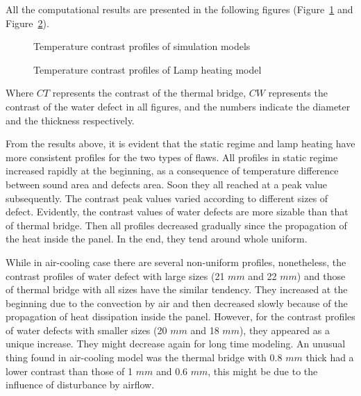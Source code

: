 All the computational results are presented in the following figures (Figure~\ref{sim_fig_stat} and Figure~\ref{sim_fig_ht}).
\begin{figure}[h]
    \hspace{-15pt}
    \caption{Temperature contrast profiles of simulation models}
    \label{sim_fig_stat}
\end{figure}

\begin{figure}[h]
    \hspace{-15pt}
    \caption{Temperature contrast profiles of Lamp heating model}
    \label{sim_fig_ht}
\end{figure}
Where $ CT $ represents the contrast of the thermal bridge, $ CW $ represents the contrast of the water defect in all figures, and the numbers indicate the diameter and the thickness respectively. 

From the results above, it is evident that the static regime and lamp heating have more consistent profiles for the two types of flaws. All profiles in static regime increased rapidly at the beginning, as a consequence of temperature difference between sound area and defects area. Soon they all reached at a peak value subsequently. The contrast peak values varied according to different sizes of defect. Evidently, the contrast values of water defects are more sizable than that of thermal bridge. Then all profiles decreased gradually since the propagation of the heat inside the panel. In the end, they tend around whole uniform. 

While in air-cooling case there are several non-uniform profiles, nonetheless, the contrast profiles of water defect with large sizes (21 $mm $ and 22 $ mm $) and those of thermal bridge with all sizes have the similar tendency. They increased at the beginning due to the convection by air and then decreased slowly because of the propagation of heat dissipation inside the panel. However, for the contrast profiles of water defects with smaller sizes (20 $ mm $ and 18 $ mm $), they appeared as a unique increase. They might decrease again for long time modeling. An unusual thing found in air-cooling model was the thermal bridge with 0.8 $ mm $ thick had a lower contrast than those of 1 $mm $ and 0.6 $ mm $, this might be due to the influence of disturbance by airflow. 

